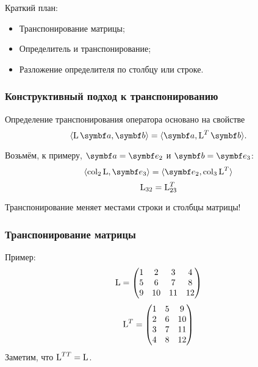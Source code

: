 
\begin{frame} %


\end{frame}



\begin{frame}{Краткий план:}
  \begin{itemize}[<+->]
    \item Транспонирование матрицы;
    \item Определитель и транспонирование;
    \item Разложение определителя по столбцу или строке.
  \end{itemize}

\end{frame}




\begin{frame}
    \frametitle{Конструктивный подход к транспонированию}

    Определение транспонирования оператора основано на свойстве 
    \[
        \langle \LL \ba, \bb \rangle = \langle \ba, \LL^T\bb\rangle.
    \]

    \pause

    Возьмём, к примеру, $\ba = \be_2$ и $\bb = \be_3$:
    \[
        \langle \col_2 \LL, \be_3 \rangle = \langle \be_2, \col_3 \LL^T \rangle
    \]
    \pause 
    \[
        \operatorname{L}_{32} = \operatorname{L}^T_{23}        
    \]
    \pause

    Транспонирование меняет местами строки и столбцы матрицы!


\end{frame}


\begin{frame}
    \frametitle{Транспонирование матрицы}

    Пример:
    \[
    \operatorname{L} = \begin{pmatrix}
        1 & 2 & 3 & 4 \\
        5 & 6 & 7 & 8 \\
        9 & 10 & 11 & 12 \\
    \end{pmatrix}    
    \]
    \pause
    \[
    \operatorname{L}^T = \begin{pmatrix}
        1 & 5 & 9 \\
        2 & 6 & 10 \\
        3 & 7 & 11 \\
        4 & 8 & 12 \\
    \end{pmatrix}    
    \]
    \pause
    Заметим, что $\operatorname{L}^{TT}=\operatorname{L}$.
\end{frame}


